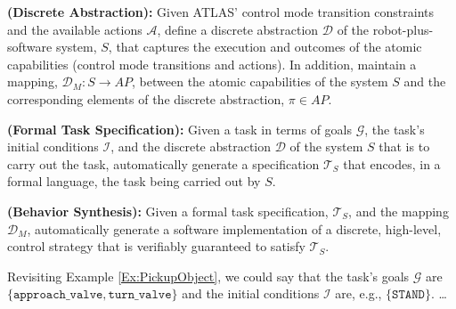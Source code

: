 
\begin{myProblem}\label{DiscreteAbstractionProblem}
\textbf{(Discrete Abstraction):}
Given ATLAS' control mode transition constraints and the available actions $\mathcal{A}$, define a discrete abstraction $\mathcal{D}$ of the robot-plus-software system, $S$, that captures the execution and outcomes of the atomic capabilities (control mode transitions and actions).
In addition, maintain a mapping, $\mathcal{D}_M : S \rightarrow AP$, between the atomic capabilities of the system $S$ and the corresponding elements of the discrete abstraction, $\pi \in AP$.
\end{myProblem}

\begin{myProblem}\label{SpecificationProblem}
\textbf{(Formal Task Specification):}
Given a task in terms of goals $\mathcal{G}$, the task's initial conditions $\mathcal{I}$, and the discrete abstraction $\mathcal{D}$ of the system $S$ that is to carry out the task, automatically generate a specification $\mathcal{T}_S$ that encodes, in a formal language, the task being carried out by $S$.
\end{myProblem}

\begin{myProblem}\label{BehaviorSynthesisProblem}
\textbf{(Behavior Synthesis):}
Given a formal task specification, $\mathcal{T}_S$, and the mapping $\mathcal{D}_M$, automatically generate a software implementation of a discrete, high-level, control strategy that is verifiably guaranteed to satisfy $\mathcal{T}_S$.
\end{myProblem}

Revisiting Example \ref{Ex:PickupObject}, we could say that the task's goals $\mathcal{G}$ are $\{ \mathtt{approach\_valve}, \mathtt{turn\_valve} \}$ and the initial conditions $\mathcal{I}$ are, e.g., $\{ \mathtt{STAND} \}$.
\ldots

